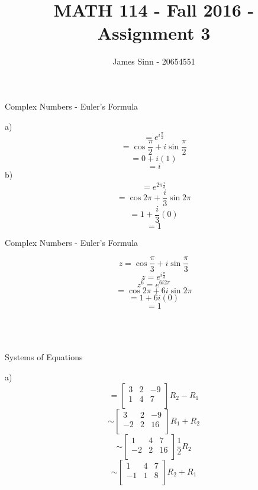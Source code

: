 \documentclass[12pt]{article}
\newenvironment{problem}[2][Problem]{\begin{trivlist}
\item[\hskip \labelsep {\bfseries #1}\hskip \labelsep {\bfseries #2.}]}{\end{trivlist}}
\begin{document}
 
 
\title{MATH 114 - Fall 2016 - Assignment 3}
\author{James Sinn - 20654551}
\maketitle
 

\begin{problem}{1}
	Complex Numbers - Euler's Formula
\end{problem}
a)\\
	\[= e^{i\frac{\pi}{2}}\]
	\[= \cos{\frac{\pi}{2}} + i \sin{\frac{\pi}{2}}\]
	\[= 0 + i (1)\]
	\[= i\]
b)\\	
	\[= e^{2\pi \frac{i}{3}}\]
	\[= \cos{2\pi} + \frac{i}{3} \sin{2\pi}\]
	\[= 1 + \frac{i}{3} (0)\]
	\[= 1\]
\begin{problem}{2}
	Complex Numbers - Euler's Formula
\end{problem}
	\[z = \cos{\frac{\pi}{3}} + i \sin{\frac{\pi}{3}}\]
	\[z = e^{i\frac{\pi}{3}}\]
	\[z^6 = e^{6i2\pi}\]
	\[= \cos{2\pi} + 6i \sin{2\pi}\]
	\[= 1 + 6i(0)\]
	\[= 1\]\\\\\\
\begin{problem}{3}
	Systems of Equations
\end{problem}
a)\\
	\[= 
		\left[
		\begin{array}{cc|c}
		3 & 2 & -9 \\
		1 & 4 & 7\\
		\end{array}
		\right] R_2 - R_1
	\]
	\[\sim
		\left[
		\begin{array}{cc|c}
		3 & 2 & -9 \\
		-2 & 2 & 16\\
		\end{array}
		\right] R_1 + R_2
	\]
	\[\sim
		\left[
		\begin{array}{cc|c}
		1 & 4 & 7 \\
		-2 & 2 & 16\\
		\end{array}
		\right] \frac{1}{2} R_2
	\]
	\[\sim
		\left[
		\begin{array}{cc|c}
		1 & 4 & 7 \\
		-1 & 1 & 8\\
		\end{array}
		\right] R_2 + R_1
	\]
\end{document}
